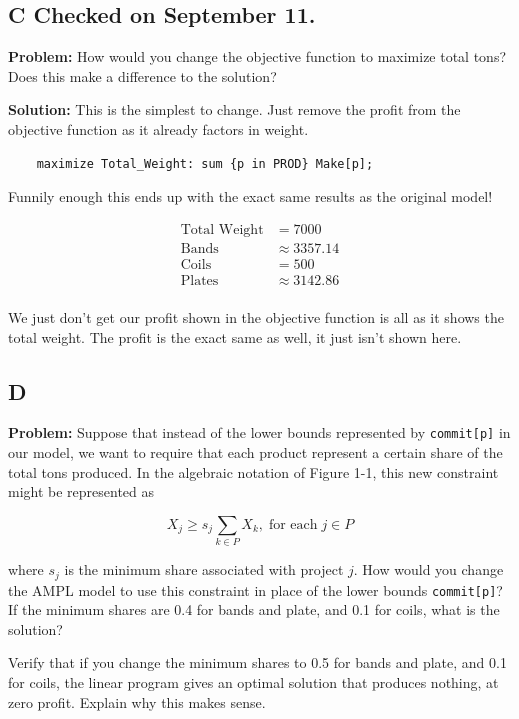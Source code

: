 \subsection*{C \checkmark Checked on September 11.}

\textbf{Problem:} How would you change the objective function to maximize total tons? Does this make a difference to the solution?

\noindent\textbf{Solution:} This is the simplest to change. Just remove the profit from the objective function as it already factors in weight. 

\begin{lstlisting}
	maximize Total_Weight: sum {p in PROD} Make[p];
\end{lstlisting}

Funnily enough this ends up with the exact same results as the original model!

\begin{align*}
	\text{Total Weight} &= 7000 \\
	\text{Bands} &\approx 3357.14 \\
	\text{Coils} &= 500 \\
	\text{Plates} &\approx 3142.86 \\
\end{align*}

We just don't get our profit shown in the objective function is all as it shows the total weight. The profit is the exact same as well, it just isn't shown here.

\subsection*{D}

\textbf{Problem:} Suppose that instead of the lower bounds represented by \texttt{commit[p]} in our model, we want to require that each product represent a certain share of the total tons produced. In the algebraic notation of Figure 1-1, this new constraint might be represented as

\[
	X_j \geq s_j \sum_{k \in P} X_k, \; \text{for each} \; j \in P
\]

where $s_j$ is the minimum share associated with project $j$. How would you change the AMPL model to use this constraint in place of the lower bounds \texttt{commit[p]}? If the minimum shares are 0.4 for bands and plate, and 0.1 for coils, what is the solution?

Verify that if you change the minimum shares to 0.5 for bands and plate, and 0.1 for coils, the linear program gives an optimal solution that produces nothing, at zero profit. Explain why this makes sense.


